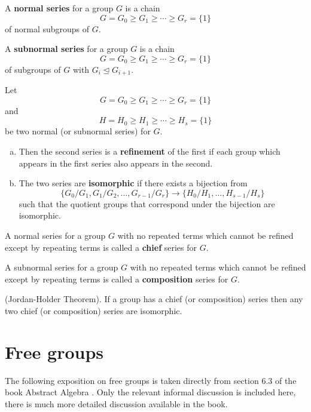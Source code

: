 \begin{definition}
A \textbf{normal series} for a group $G$ is a chain
$$ G = G_0 \geq G_1 \geq \cdots \geq G_r = \{1\}$$
of normal subgroups of $G$.
\end{definition}

\begin{definition}
A \textbf{subnormal series} for a group $G$ is a chain
$$ G = G_0 \geq G_1 \geq \cdots \geq G_r = \{1\}$$
of subgroups of $G$ with $G_i \trianglelefteq G_{i+1}$.
\end{definition}

\begin{definition}
Let 
$$ G = G_0 \geq G_1 \geq \cdots \geq G_r = \{1\}$$
and
$$ H = H_0 \geq H_1 \geq \cdots \geq H_s = \{1\}$$
be two normal (or subnormal series) for $G$.
\begin{enumerate}[(a)]
\item Then the second series is a \textbf{refinement} of the first if each group which appears in the first series also appears in the second.
\item The two series are \textbf{isomorphic} if there exists a bijection from 
$$\{G_0/G_1, G_1/G_2, \ldots , G_{r-1}/G_r \} \rightarrow \{ H_0/H_1, \ldots , H_{s-1}/H_s\}$$
such that the quotient groups that correspond under the bijection are isomorphic. 
\end{enumerate}
\end{definition}

\begin{definition}
A normal series for a group $G$ with no repeated terms which cannot be refined except by repeating terms is called a \textbf{chief} series for $G$.
\end{definition}


\begin{definition}
A subnormal series for a group $G$ with no repeated terms which cannot be refined except by repeating terms is called a \textbf{composition} series for $G$.
\end{definition}

\begin{theorem}{(Jordan-Holder Theorem).} If a group has a chief (or composition) series then any two chief (or composition) series are isomorphic.
\end{theorem}

\section{Free groups}
The following exposition on free groups is taken directly from section 6.3 of the book Abstract Algebra \citep{dummit}. Only the relevant informal discussion is included here, there is much more detailed discussion available in the book. \\

